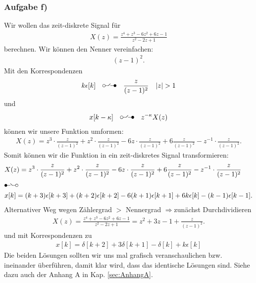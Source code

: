 \documentclass[11pt,a4paper,DIV=12]{scrartcl}
\renewcommand{\ztransf}{\mbox{\setlength{\unitlength}{0.1em}%
                            \begin{picture}(20,10)%
                              \put(2,3){\circle{4}}%
                              \put(4,3){\line(1,0){4.75}}%
                              \multiput(8.625,3.15)(0.25,0.25){11}{%
                                \makebox(0,0){\rmfamily\tiny .}}%
                              \put(17,3){\line(-1,0){5.75}}%
                              \put(18,3){\circle*{4}}%
                            \end{picture}%
                           }
                      }
\renewcommand{\Ztransf}{\mbox{\setlength{\unitlength}{0.1em}%
                            \begin{picture}(20,10)%
                              \put(2,3){\circle*{4}}%
                              \put(3,3){\line(1,0){5.75}}%
                              \multiput(11.375,3.15)(-0.25,0.25){11}{%
                                \makebox(0,0){\rmfamily\tiny .}}%
                              \put(16,3){\line(-1,0){4.75}}%
                              \put(18,3){\circle{4}}%
                            \end{picture}%
                           }
                      }
\begin{document}
\subsubsection{Aufgabe f)}
Wir wollen das zeit-diskrete Signal für
\begin{align}
	X(z)=\frac{z^4+z^3-6z^2+6z-1}{z^2-2z+1}
\end{align}
berechnen.
Wir können den Nenner vereinfachen:
\begin{align}
	(z-1)^2.
\end{align}
Mit den Korrespondenzen
\begin{align}
	k\epsilon[k]\quad\ztransf\quad\frac{z}{(z-1)^2}\quad |z|>1
\end{align}
und
\begin{align}
	x[k-\kappa]\quad\ztransf\quad z^{-\kappa}X(z)
\end{align}
können wir unsere Funktion umformen:
\begin{align}
	X(z)=z^3\cdot\frac{z}{(z-1)^2}+z^2\cdot\frac{z}{(z-1)^2}-6z\cdot\frac{z}{(z-1)^2}+6\frac{z}{(z-1)^2}-z^{-1}\cdot\frac{z}{(z-1)^2}.
\end{align}
Somit können wir die Funktion in ein zeit-diskretes Signal transformieren:
\begin{align}
	&X(z)=z^3\cdot\frac{z}{(z-1)^2}+z^2\cdot\frac{z}{(z-1)^2}-6z\cdot\frac{z}{(z-1)^2}+6\frac{z}{(z-1)^2}-z^{-1}\cdot\frac{z}{(z-1)^2} \nonumber\\
	&\Ztransf \nonumber\\
	&x[k]=(k+3)\epsilon[k+3]+(k+2)\epsilon[k+2]-6(k+1)\epsilon[k+1]+6k\epsilon[k]-(k-1)\epsilon[k-1].
\end{align}
%
%
Alternativer Weg wegen Zählergrad $>$ Nennergrad \quad $\Rightarrow$\quad zunächst
Durchdividieren
\begin{align}
X(z) = \frac{z^4 + z^3 -6z^2 + 6z -1}{z^2-2z+1} = z^2 + 3 z - 1 + \frac{z}{(z-1)^2}.
\end{align}%
und mit Korrespondenzen zu
\begin{align}
x[k] = \delta[k+2] +3 \delta[k+1] -\delta[k] +k\epsilon[k]
\end{align}
%
Die beiden Lösungen sollten wir uns mal grafisch veranschaulichen bzw. ineinander
überführen, damit klar wird, dass das identische Lösungen sind. Siehe dazu auch
der Anhang A in Kap. \ref{sec:AnhangA}.
\end{document}
